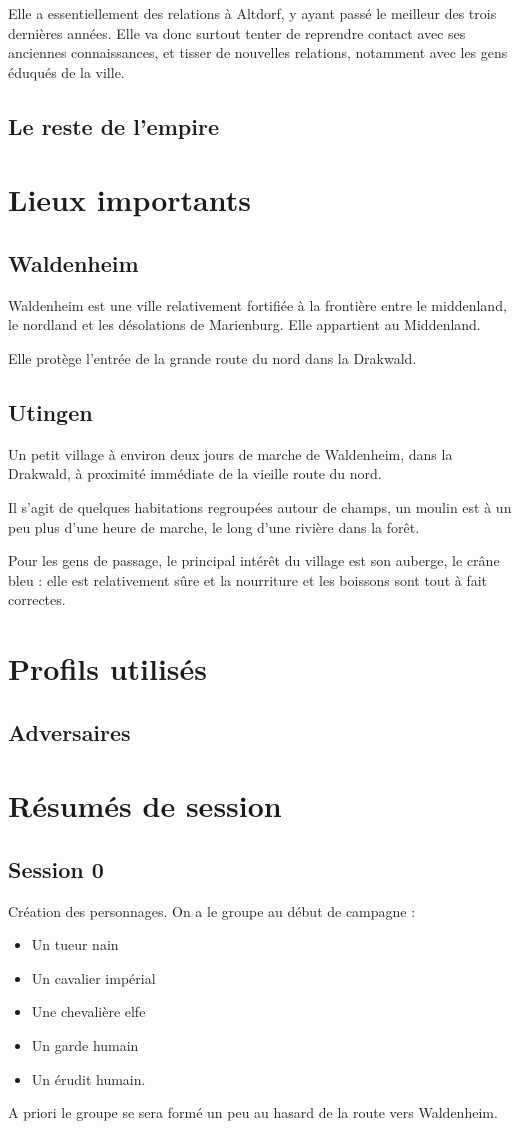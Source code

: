 \documentclass[10pt,a4paper]{book}
\begin{document}
Elle a essentiellement des relations à Altdorf, y ayant passé le meilleur des trois dernières années. Elle va donc surtout tenter de reprendre contact avec ses anciennes connaissances, et tisser de nouvelles relations, notamment avec les gens éduqués de la ville.
\section{Le reste de l'empire}

\chapter{Lieux importants}
\section{Waldenheim}
Waldenheim est une ville relativement fortifiée à la frontière entre le middenland, le nordland et les désolations de Marienburg. Elle appartient au Middenland.

Elle protège l'entrée de la grande route du nord dans la Drakwald.
\section{Utingen}
Un petit village à environ deux jours de marche de Waldenheim, dans la Drakwald, à proximité immédiate de la vieille route du nord. 

Il s'agit de quelques habitations regroupées autour de champs, un moulin est à un peu plus d'une heure de marche, le long d'une rivière dans la forêt. 

Pour les gens de passage, le principal intérêt du village est son auberge, le crâne bleu : elle est relativement sûre et la nourriture et les boissons sont tout à fait correctes.
\chapter{Profils utilisés}
\section{Adversaires}

\chapter{Résumés de session}
\section{Session 0}
Création des personnages. On a le groupe au début de campagne :
\begin{itemize}
\item Un tueur nain
\item Un cavalier impérial
\item Une chevalière elfe
\item Un garde humain
\item Un érudit humain.
\end{itemize}
A priori le groupe se sera formé un peu au hasard de la route vers Waldenheim.
\end{document}
